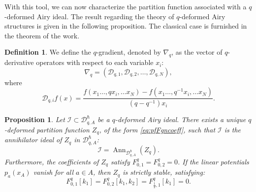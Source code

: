 \documentclass[reqno,11pt]{amsart}
\theoremstyle{plain}
\newtheorem{proposition}[theorem]{Proposition}
\theoremstyle{definition}
\newtheorem{definition}[theorem]{Definition}
\theoremstyle{remark}
\numberwithin{equation}{section}
\newcommand{\1}{\mathds{1}}
\newcommand{\2}{\frac{1}{2}}
\begin{document}
{				With this tool, we can now characterize the partition function associated with a $q$-deformed Airy ideal.	The result regarding the theory of $q$-deformed Airy structures is given in the following proposition. The classical case is furnished in the theorem of the work\cite{KS17}.
				\begin{definition}
					{We define the $q$-gradient, denoted by $\nabla_q$, as the vector of $q$-derivative operators with respect to each variable $x_i$:
						\begin{equation}
							\nabla_q = \left( 	\mathcal{D}_{q,1}, 	\mathcal{D}_{q,2}, \dots, 	\mathcal{D}_{q,N} \right),\end{equation}
						where
						\begin{equation}	\mathcal{D}_{q,i} f(x) = \frac{f(x_1\dots, qx_i, \dots x_N) - f(x_1\dots, q^{-1}x_i, \dots x_N)}{(q-q^{-1})x_i}.
					\end{equation}}
				\end{definition}
				\begin{proposition}\label{t:airy}
					Let $\mathcal{I} \subset \mathcal{D}_{q,A}^\hslash$ be a  $q$-deformed Airy ideal. There exists a unique  $q$-deformed partition function $Z_q$, of the form \eqref{eq:pfFgncoeff}, such that $\mathcal{I}$ is the annihilator ideal of $Z_q$ in $\mathcal{D}_{q,A}^\hslash$:
					\begin{equation}
						\mathcal{I} = \operatorname{Ann}_{\mathcal{D}_{q,A}^\hslash}(Z_q).
					\end{equation}
					Furthermore, the coefficients of $Z_q$ satisfy $F^q_{0,1} = F^q_{0,2} = 0$. If the linear potentials $p_a(x_A)$ vanish for all $a \in A$, then $Z_q$ is strictly stable, satisfying:
					\begin{equation}
						F^{q}_{0,1}[k_1] = F^{q}_{0,2}[k_1,k_2] = F^{q}_{\frac{1}{2},1}[k_1] = 0.
					\end{equation}
				\end{proposition}
					
}
\end{document}
